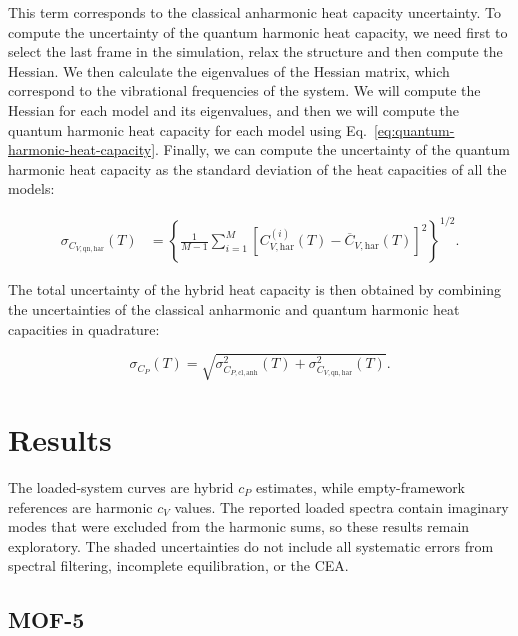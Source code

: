 \documentclass[12pt,a4paper]{article}
\numberwithin{equation}{section}
\begin{document}
This term corresponds to the classical anharmonic heat capacity uncertainty.
To compute the uncertainty of the quantum harmonic heat capacity,
we need first to select the last frame in the simulation, relax the structure and then compute the Hessian.
We then calculate the eigenvalues of the Hessian matrix, which correspond to the vibrational frequencies of the system.
We will compute the Hessian for each model and its eigenvalues,
and then we will compute the quantum harmonic heat capacity for each model using Eq.~\eqref{eq:quantum-harmonic-heat-capacity}.
Finally, we can compute the uncertainty of the quantum harmonic heat capacity as the standard deviation of the heat capacities of all the models:

\begin{equation}
  \begin{aligned}
  \sigma_{C_{V,\mathrm{qn,har}}}(T)
  &=\left\{\frac{1}{M-1}\sum_{i=1}^{M}
  \left[C_{V,\mathrm{har}}^{(i)}(T)
  -\overline C_{V,\mathrm{har}}(T)\right]^2\right\}^{1/2}.
  \end{aligned}
  \label{eq:llpr-cv-spread}
\end{equation}

The total uncertainty of the hybrid heat capacity is then obtained
by combining the uncertainties of the classical anharmonic and quantum harmonic heat capacities in quadrature:

\begin{equation}
  \sigma_{C_P}(T)
  =\sqrt{\sigma_{C_{P,\mathrm{cl,anh}}}^2(T)
  +\sigma_{C_{V,\mathrm{qn,har}}}^2(T)}.
  \label{eq:llpr-cp-total-uncertainty}
\end{equation}

\section{Results}
\label{sec:results}

The loaded-system curves are hybrid $c_P$ estimates, while empty-framework
references are harmonic $c_V$ values. The reported loaded spectra contain
imaginary modes that were excluded from the harmonic sums, so these results
remain exploratory. The shaded uncertainties do not include all systematic
errors from spectral filtering, incomplete equilibration, or the CEA.

\subsection{MOF-5}
\label{sec:mof-5-results}
\end{document}
